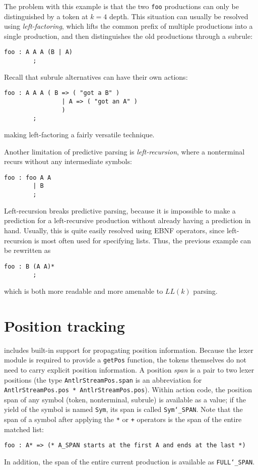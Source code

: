 The problem with this example is that the two \texttt{foo} productions can only be distinguished by a token at $k = 4$ depth.  This situation can usually be resolved using \emph{left-factoring}, which lifts the common prefix of multiple productions into a single production, and then distinguishes the old productions through a subrule:
\begin{lstlisting}[language=MLAntlr]
    foo : A A A (B | A)
        ;
\end{lstlisting}%
Recall that subrule alternatives can have their own actions:
\begin{lstlisting}[language=MLAntlr]
    foo : A A A ( B => ( "got a B" ) 
                | A => ( "got an A" )
                )
        ;
\end{lstlisting}%
making left-factoring a fairly versatile technique.

Another limitation of predictive parsing is \emph{left-recursion}, where a nonterminal recurs without any intermediate symbols:
\begin{lstlisting}[language=MLAntlr]
    foo : foo A A
        | B
        ;
\end{lstlisting}%
Left-recursion breaks predictive parsing, because it is impossible to make a prediction for a left-recursive production without already having a prediction in hand.  Usually, this is quite easily resolved using EBNF operators, since left-recursion is most often used for specifying lists.  Thus, the previous example can be rewritten as
\begin{lstlisting}[language=MLAntlr]
    foo : B (A A)*
        ;
\end{lstlisting}%
which is both more readable and more amenable to $LL(k)$ parsing.

\section{Position tracking}

\antlr{} includes built-in support for propagating position information.  Because the lexer module is required to provide a \texttt{getPos} function, the tokens themselves do not need to carry explicit position information.
A position \emph{span} is a pair to two lexer positions (the type \texttt{AntlrStreamPos.span} is an abbreviation for \texttt{AntlrStreamPos.pos * AntlrStreamPos.pos}).
Within action code, the position span of any symbol (token, nonterminal, subrule) is available as a value; if the yield of the symbol is named \texttt{Sym}, its span is called \texttt{Sym\char`\_SPAN}.
Note that the span of a symbol after applying the \texttt{*} or \texttt{+} operators is the span of the entire matched list:
\begin{lstlisting}[language=MLAntlr]
    foo : A* => (* A_SPAN starts at the first A and ends at the last *)
\end{lstlisting}%
In addition, the span of the entire current production is available as \texttt{FULL\char`\_SPAN}.

